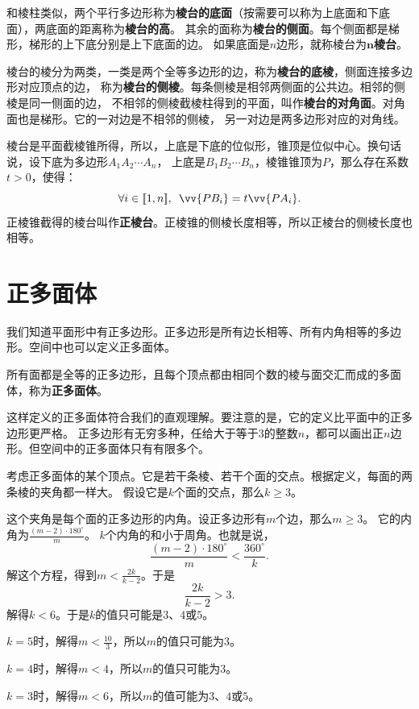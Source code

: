 \documentclass[12pt,UTF8,fontset=none]{ctexbook}
\begin{document}
和棱柱类似，两个平行多边形称为\textbf{棱台的底面}（按需要可以称为上底面和下底面），两底面的距离称为\textbf{棱台的高}。
其余的面称为\textbf{棱台的侧面}。每个侧面都是梯形，梯形的上下底分别是上下底面的边。
如果底面是$n$边形，就称棱台为$\mathbf{n}$\textbf{棱台}。

棱台的棱分为两类，一类是两个全等多边形的边，称为\textbf{棱台的底棱}，侧面连接多边形对应顶点的边，
称为\textbf{棱台的侧棱}。每条侧棱是相邻两侧面的公共边。相邻的侧棱是同一侧面的边，
不相邻的侧棱截棱柱得到的平面，叫作\textbf{棱台的对角面}。对角面也是梯形。它的一对边是不相邻的侧棱，
另一对边是两多边形对应的对角线。

棱台是平面截棱锥所得，所以，上底是下底的位似形，锥顶是位似中心。换句话说，设下底为多边形$A_1A_2\cdots A_n$，
上底是$B_1B_2\cdots B_n$，棱锥锥顶为$P$，那么存在系数$t>0$，使得：
$$\forall i\in\hin{1}{n},\,\,\,\vv{PB_i} = t\vv{PA_i}.$$
正棱锥截得的棱台叫作\textbf{正棱台}。正棱锥的侧棱长度相等，所以正棱台的侧棱长度也相等。

\section{正多面体}
我们知道平面形中有正多边形。正多边形是所有边长相等、所有内角相等的多边形。空间中也可以定义正多面体。

\begin{df}
    所有面都是全等的正多边形，且每个顶点都由相同个数的棱与面交汇而成的多面体，称为\textbf{正多面体}。
\end{df}

这样定义的正多面体符合我们的直观理解。要注意的是，它的定义比平面中的正多边形更严格。
正多边形有无穷多种，任给大于等于$3$的整数$n$，都可以画出正$n$边形。但空间中的正多面体只有有限多个。

考虑正多面体的某个顶点。它是若干条棱、若干个面的交点。根据定义，每面的两条棱的夹角都一样大。
假设它是$k$个面的交点，那么$k \geqslant 3$。

这个夹角是每个面的正多边形的内角。设正多边形有$m$个边，那么$m \geqslant 3$。
它的内角为$\frac{(m - 2)\cdot 180^\circ}{m}$。
$k$个内角的和小于周角。也就是说，
$$ \frac{(m - 2)\cdot 180^\circ}{m} < \frac{360^\circ}{k}.$$
解这个方程，得到$m < \frac{2k}{k - 2}$。于是
$$ \frac{2k}{k - 2} > 3.$$
解得$k < 6$。于是$k$的值只可能是$3$、$4$或$5$。

$k = 5$时，解得$m < \frac{10}{3}$，所以$m$的值只可能为$3$。

$k = 4$时，解得$m < 4$，所以$m$的值只可能为$3$。

$k = 3$时，解得$m < 6$，所以$m$的值可能为$3$、$4$或$5$。
\end{document}
